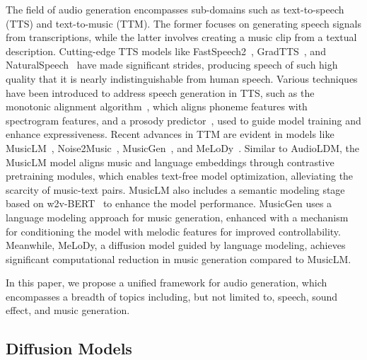 \documentclass[lettersize,journal]{IEEEtran}
\begin{document}
The field of audio generation encompasses sub-domains such as text-to-speech (TTS) and text-to-music (TTM). The former focuses on generating speech signals from transcriptions, while the latter involves creating a music clip from a textual description. Cutting-edge TTS models like FastSpeech2~\cite{Fastspeech2}, GradTTS~\cite{popov2021gradtts}, and NaturalSpeech~\cite{tan2022naturalspeech} have made significant strides, producing speech of such high quality that it is nearly indistinguishable from human speech. Various techniques have been introduced to address speech generation in TTS, such as the monotonic alignment algorithm~\cite{kim2020glowtts}, which aligns phoneme features with spectrogram features, and a prosody predictor~\cite{Fastspeech2}, used to guide model training and enhance expressiveness. Recent advances in TTM are evident in models like MusicLM~\cite{agostinelli2023musiclm}, Noise2Music~\cite{huang2023noise2music}, MusicGen~\cite{copet2023simple-musicgen}, and MeLoDy~\cite{lam2023efficient-melody}. Similar to AudioLDM, the MusicLM model aligns music and language embeddings through contrastive pretraining modules, which enables text-free model optimization, alleviating the scarcity of music-text pairs. MusicLM also includes a semantic modeling stage based on w2v-BERT~\cite{chung2021w2v} to enhance the model performance. MusicGen uses a language modeling approach for music generation, enhanced with a mechanism for conditioning the model with melodic features for improved controllability. Meanwhile, MeLoDy, a diffusion model guided by language modeling, achieves significant computational reduction in music generation compared to MusicLM.

In this paper, we propose a unified framework for audio generation, which encompasses a breadth of topics including, but not limited to, speech, sound effect, and music generation.

\subsection{Diffusion Models}
\end{document}
